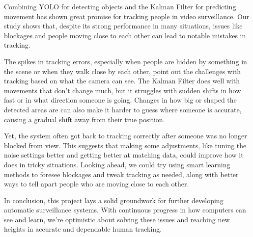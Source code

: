 \documentclass{article}
\begin{document}
Combining YOLO for detecting objects and the Kalman Filter for predicting movement has shown great promise for tracking people in video surveillance. Our study shows that, despite its strong performance in many situations, issues like blockages and people moving close to each other can lead to notable mistakes in tracking.

The spikes in tracking errors, especially when people are hidden by something in the scene or when they walk close by each other, point out the challenges with tracking based on what the camera can see. The Kalman Filter does well with movements that don’t change much, but it struggles with sudden shifts in how fast or in what direction someone is going. Changes in how big or shaped the detected areas are can also make it harder to guess where someone is accurate, causing a gradual shift away from their true position.

Yet, the system often got back to tracking correctly after someone was no longer blocked from view. This suggests that making some adjustments, like tuning the noise settings better and getting better at matching data, could improve how it does in tricky situations. Looking ahead, we could try using smart learning methods to foresee blockages and tweak tracking as needed, along with better ways to tell apart people who are moving close to each other.

In conclusion, this project lays a solid groundwork for further developing automatic surveillance systems. With continuous progress in how computers can see and learn, we’re optimistic about solving these issues and reaching new heights in accurate and dependable human tracking.  



\end{document}
